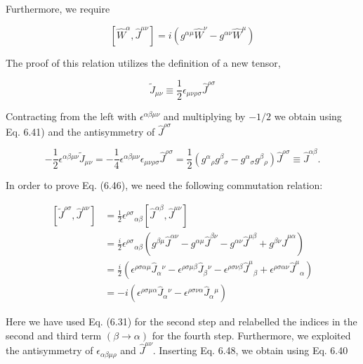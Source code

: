 \documentclass[10pt, letterpaper]{article}
\begin{document}
Furthermore, we require

$$
\left[\hat{W}^{\alpha}, \hat{J}^{\mu \nu}\right]=i\left(g^{\alpha \mu} \hat{W}^{\nu}-g^{\alpha \nu} \hat{W}^{\mu}\right)
$$

The proof of this relation utilizes the definition of a new tensor,

$$
\tilde{J}_{\mu \nu} \equiv \frac{1}{2} \epsilon_{\mu \nu \rho \sigma} \hat{J}^{\rho \sigma}
$$

Contracting from the left with $\epsilon^{\alpha \beta \mu \nu}$ and multiplying by $-1 / 2$ we obtain using Eq. 6.41) and the antisymmetry of $\hat{J}^{\rho \sigma}$

$$
-\frac{1}{2} \epsilon^{\alpha \beta \mu \nu} \tilde{J}_{\mu \nu}=-\frac{1}{4} \epsilon^{\alpha \beta \mu \nu} \epsilon_{\mu \nu \rho \sigma} \hat{J}^{\rho \sigma}=\frac{1}{2}\left(g^{\alpha}{ }_{\rho} g^{\beta}{ }_{\sigma}-g^{\alpha}{ }_{\sigma} g^{\beta}{ }_{\rho}\right) \hat{J}^{\rho \sigma} \equiv \hat{J}^{\alpha \beta} .
$$

In order to prove Eq. (6.46), we need the following commutation relation:

$$
\begin{aligned}
{\left[\tilde{J}^{\rho \sigma}, \hat{J}^{\mu \nu}\right] } & =\frac{1}{2} \epsilon^{\rho \sigma}{ }_{\alpha \beta}\left[\hat{J}^{\alpha \beta}, \hat{J}^{\mu \nu}\right] \\
& =\frac{i}{2} \epsilon^{\rho \sigma}{ }_{\alpha \beta}\left(g^{\beta \mu} \hat{J}^{\alpha \nu}-g^{\alpha \mu} \hat{J}^{\beta \nu}-g^{\alpha \nu} \hat{J}^{\mu \beta}+g^{\beta \nu} \hat{J}^{\mu \alpha}\right) \\
& =\frac{i}{2}\left(\epsilon^{\rho \sigma \alpha \mu} \hat{J}_{\alpha}{ }^{\nu}-\epsilon^{\rho \sigma \mu \beta} \hat{J}_{\beta}{ }^{\nu}-\epsilon^{\rho \sigma \nu \beta} \hat{J}^{\mu}{ }_{\beta}+\epsilon^{\rho \sigma \alpha \nu} \hat{J}^{\mu}{ }_{\alpha}\right) \\
& =-i\left(\epsilon^{\rho \sigma \mu \alpha} \hat{J}_{\alpha}{ }^{\nu}-\epsilon^{\rho \sigma \nu \alpha} \hat{J}_{\alpha}{ }^{\mu}\right)
\end{aligned}
$$

Here we have used Eq. (6.31) for the second step and relabelled the indices in the second and third term $(\beta \rightarrow \alpha)$ for the fourth step. Furthermore, we exploited the antisymmetry of $\epsilon_{\alpha \beta \mu \rho}$ and $\hat{J}^{\mu \nu}$. Inserting Eq. 6.48, we obtain using Eq. 6.40
\end{document}
